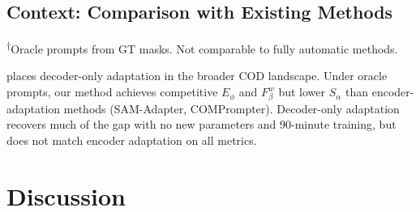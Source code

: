 \documentclass[10pt,twocolumn,letterpaper]{article}
\begin{document}
\subsection{Context: Comparison with Existing Methods}

\begin{table}[t]
\centering
\caption{\textbf{Landscape comparison} on COD10K. Dedicated COD methods are fully automatic; SAM-based methods use encoder/prompt tuning; ours uses oracle prompts.\textsuperscript{$\dagger$} These are \emph{not} head-to-head comparisons.}
\label{tab:comparison}
\small
{}
\vspace{1pt}
{\footnotesize \textsuperscript{$\dagger$}Oracle prompts from GT masks. Not comparable to fully automatic methods.}
\end{table}

 places decoder-only adaptation in the broader COD landscape. Under oracle prompts, our method achieves competitive $E_\phi$ and $F_\beta^w$ but lower $S_\alpha$ than encoder-adaptation methods (SAM-Adapter, COMPrompter). Decoder-only adaptation recovers much of the gap with no new parameters and 90-minute training, but does not match encoder adaptation on all metrics.

\section{Discussion}
\end{document}
